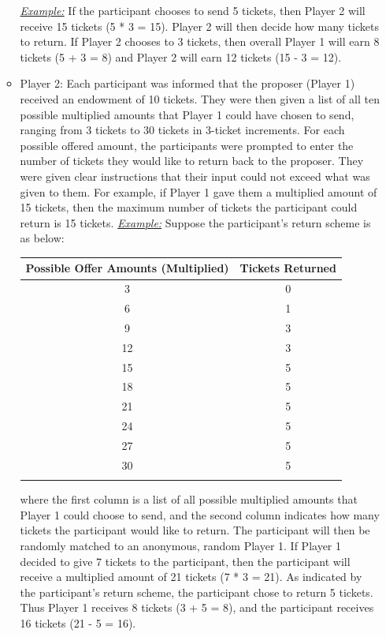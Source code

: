 \documentclass[12pt]{article}
\begin{document}
\begin{itemize}
\begin{itemize}
		\subitem \underline{\textit{Example:}} If the participant chooses to send 5 tickets, then Player 2 will receive 15 tickets (5 * 3 = 15). Player 2 will then decide how many tickets to return. If Player 2 chooses to 3 tickets, then overall Player 1 will earn 8 tickets (5 + 3 = 8) and Player 2 will earn 12 tickets (15 - 3 = 12).
		\item{Player 2}: Each participant was informed that the proposer (Player 1) received an endowment of 10 tickets. They were then given a list of all ten possible multiplied amounts that Player 1 could have chosen to send, ranging from 3 tickets to 30 tickets in 3-ticket increments. For each possible offered amount, the participants were prompted to enter the number of tickets they would like to return back to the proposer. They were given clear instructions that their input could not exceed what was given to them. For example, if Player 1 gave them a multiplied amount of 15 tickets, then the maximum number of tickets the participant could return is 15 tickets.
		\subitem \underline{\textit{Example:}} Suppose the participant\rq s return scheme is as below:
		
		\begin{center}
\begin{tabular}{ c c }
\hline \hline
 Possible Offer Amounts (Multiplied) & Tickets Returned \\ 
 \hline
3 & 0  \\  
6 & 1 \\  
9 & 3  \\  
12 & 3  \\  
15 & 5   \\  
18 & 5  \\  
21 & 5 \\  
24 & 5 \\  
27 & 5 \\  
30 & 5 \\  
\hline \hline \\
\end{tabular}
\end{center} 

	where the first column is a list of all possible multiplied amounts that Player 1 could choose to send, and the second column indicates how many tickets the participant would like to return. The participant will then be randomly matched to an anonymous, random Player 1. If Player 1 decided to give 7 tickets to the participant, then the participant will receive a multiplied amount of 21 tickets (7 * 3 = 21). As indicated by the participant\rq s return scheme, the participant chose to return 5 tickets. Thus Player 1 receives 8 tickets (3 + 5 =  8), and the participant receives 16 tickets (21 - 5 = 16).
	\end{itemize}
	

\end{itemize}
\end{document}
